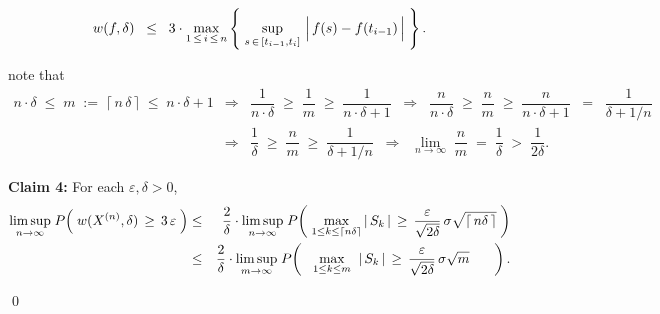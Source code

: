 \begin{equation*}
	w(f,\delta) \;\; \leq \;\; 3 \cdot
	\max_{1\,\leq\,i\,\leq\,n}\left\{\;
	\sup_{s\,\in\,[t_{i-1},t_{i}]}\,\left\vert\,\overset{{\color{white}.}}{f}(s) - f(t_{i-1})\,\right\vert
	\;\right\}.
\end{equation*}

note that
\begin{eqnarray*}
n\cdot\delta \;\leq\; m \;:=\; \lceil\,n\,\delta\,\rceil \;\leq\; n\cdot\delta + 1
&\Longrightarrow&
	\dfrac{1}{n\cdot\delta} \;\geq\; \dfrac{1}{m} \;\geq\; \dfrac{1}{n\cdot\delta + 1}
\;\;\Longrightarrow\;\;
	\dfrac{n}{n\cdot\delta} \;\geq\; \dfrac{n}{m} \;\geq\; \dfrac{n}{n\cdot\delta + 1}
	\;\;=\;\; \dfrac{1}{\delta + 1/n}
\\
&\Longrightarrow&
	\dfrac{1}{\delta} \;\geq\; \dfrac{n}{m} \;\geq\; \dfrac{1}{\delta + 1/n}
\;\;\Longrightarrow\;\;
	\underset{n\rightarrow\infty}{\lim}\;\dfrac{n}{m} \;=\; \dfrac{1}{\delta} \;>\; \dfrac{1}{2\delta}.
\end{eqnarray*}
%


\vskip 0.5cm
\begin{center}
\begin{minipage}{6.5in}
\noindent
\textbf{Claim 4:}\quad
For each $\varepsilon, \delta > 0$,
\begin{eqnarray*}
	\underset{n\rightarrow\infty}{\limsup}\;
	P\!\left(\; w(X^{(n)},\delta) \,\overset{{\color{white}.}}{\geq}\, 3\,\varepsilon \;\right)
&\leq& \dfrac{2}{\delta}\cdot
	\underset{n\rightarrow\infty}{\limsup}\;
	P\!\left(\;
	\underset{1 \leq k\leq\lceil n\delta \rceil}{\max}\,\vert\,S_{k}\,\vert
	\,\overset{{\color{white}.}}{\geq}\,
	\dfrac{\varepsilon}{\sqrt{2\delta}}\,\sigma\sqrt{\lceil\,n\delta\,\rceil} 
	\;\right)
\\
&\leq& \dfrac{2}{\delta}\cdot
	\underset{m\rightarrow\infty}{\limsup}\;
	P\!\left(\;\;\;
	\underset{1 \leq k\leq m}{\max}\;\;\vert\,S_{k}\,\vert
	\,\overset{{\color{white}.}}{\geq}\,
	\dfrac{\varepsilon}{\sqrt{2\delta}}\,\sigma\sqrt{m} 
	\quad\;\;\;\right).
\end{eqnarray*}
\end{minipage}
\end{center}

\qed


